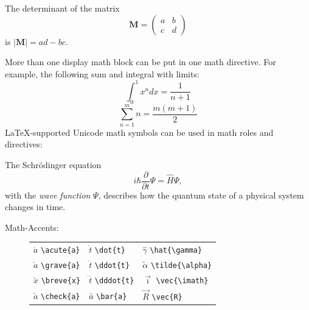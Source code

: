 \documentclass[a4paper]{article}
\newlength{\DUtablewidth} %
\begin{document}
The determinant of the matrix
%
\begin{equation*}
\mathbf{M} = \left(\begin{matrix}a&b\\c&d\end{matrix}\right)
\label{eq-m}
\end{equation*}
is $|\mathbf{M}| = ad - bc$.

More than one display math block can be put in one math directive.
For example, the following sum and integral with limits:
%
\begin{equation*}
\int_0^1 x^n dx = \frac{1}{n + 1}
\end{equation*}%
\begin{equation*}
\sum_{n=1}^m n = \frac{m(m+1)}{2}
\end{equation*}
LaTeX-supported Unicode math symbols can be used in math roles and
directives:

The Schrödinger equation
%
\begin{equation*}
i\hbar \frac{\partial }{\partial t}\Psi  = \hat{H}\Psi ,
\label{eq-schrodinger}
\end{equation*}
with the \emph{wave function} $\Psi $, describes how the quantum state of a
physical system changes in time.

\begin{description}
\item[{Math-Accents:}] \leavevmode
\setlength{\DUtablewidth}{1\linewidth}%
\begin{longtable*}{p{0.315\DUtablewidth}p{0.315\DUtablewidth}p{0.315\DUtablewidth}}

$\acute{a}$      \texttt{\textbackslash{}acute\{a\}}
 & 
$\dot{t}$        \texttt{\textbackslash{}dot\{t\}}
 & 
$\hat{\gamma}$   \texttt{\textbackslash{}hat\{\textbackslash{}gamma\}}
 \\

$\grave{a}$      \texttt{\textbackslash{}grave\{a\}}
 & 
$\ddot{t}$       \texttt{\textbackslash{}ddot\{t\}}
 & 
$\tilde{\alpha}$ \texttt{\textbackslash{}tilde\{\textbackslash{}alpha\}}
 \\

$\breve{x}$      \texttt{\textbackslash{}breve\{x\}}
 & 
$\dddot{t}$      \texttt{\textbackslash{}dddot\{t\}}
 & 
$\vec{\imath}$   \texttt{\textbackslash{}vec\{\textbackslash{}imath\}}
 \\

$\check{a}$      \texttt{\textbackslash{}check\{a\}}
 & 
$\bar{a}$        \texttt{\textbackslash{}bar\{a\}}
 & 
$\vec{R}$        \texttt{\textbackslash{}vec\{R\}}
 \\
\end{longtable*}
\end{description}
\end{document}
